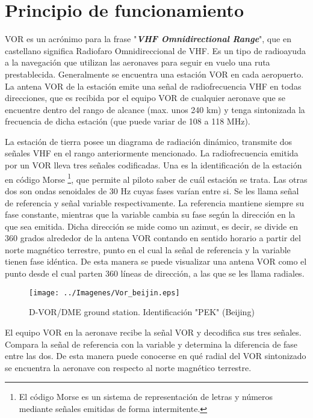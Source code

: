 


\section*{Principio de funcionamiento}
\label{Principio de funcionamiento}

VOR es un acrónimo para la frase "\textbf{\textit{VHF Omnidirectional Range}}", que en castellano significa Radiofaro Omnidireccional de VHF. Es un tipo de radioayuda a la navegación que utilizan las aeronaves para seguir en vuelo una ruta prestablecida. Generalmente se encuentra una estación VOR en cada aeropuerto. La antena VOR de la estación emite una señal de radiofrecuencia VHF en todas direcciones, que es recibida por el equipo VOR de cualquier aeronave que se encuentre dentro del rango de alcance (max. unos 240 km) y tenga sintonizada la frecuencia de dicha estación (que puede variar de 108 a 118 MHz).

La estación de tierra posee un diagrama de radiación dinámico, transmite dos señales VHF en el rango anteriormente mencionado. La radiofrecuencia emitida por un VOR lleva tres señales codificadas. Una es la identificación de la estación en código Morse \footnote{El código Morse es un sistema de representación de letras y números mediante señales emitidas de forma intermitente.}, que permite al piloto saber de cuál estación se trata. Las otras dos son ondas senoidales de 30 Hz cuyas fases varían entre si. Se les llama señal de referencia y señal variable respectivamente. La referencia mantiene siempre su fase constante, mientras que la variable cambia su fase según la dirección en la que sea emitida. Dicha dirección se mide como un azimut, es decir, se divide en 360 grados alrededor de la antena VOR contando en sentido horario a partir del norte magnético terrestre, punto en el cual la señal de referencia y la variable tienen fase idéntica. De esta manera se puede visualizar una antena VOR como el punto desde el cual parten 360 líneas de dirección, a las que se les llama radiales.

\begin{wrapfigure}{r}{100mm}
 \centering
 \begin{center}
 \texttt{[image: ../Imagenes/Vor\_beijin.eps]}
\end{center}
 \caption{D-VOR/DME ground station. Identificación "PEK" (Beijing)  \cite{VOR-Wikipedia}}
 \label{fig:Vor_de_Beijin}
\end{wrapfigure}

El equipo VOR en la aeronave recibe la señal VOR y decodifica sus tres señales. Compara la señal de referencia con la variable y determina la diferencia de fase entre las dos. De esta manera puede conocerse en qué radial del VOR sintonizado se encuentra la aeronave con respecto al norte magnético terrestre.

